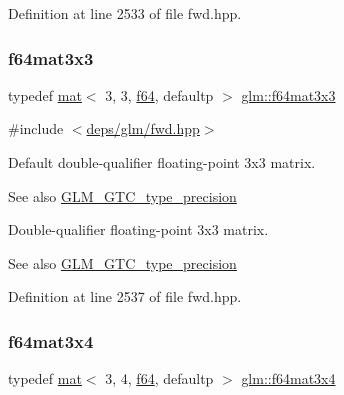 Definition at line 2533 of file fwd.\+hpp.

\mbox{\label{group__gtc__type__precision_ga3b494201796c4200886e59f9695ecff0}} 
\subsubsection{\texorpdfstring{f64mat3x3}{f64mat3x3}}
{\footnotesize\ttfamily typedef \hyperlink{structglm_1_1mat}{mat}$<$ 3, 3, \hyperlink{group__gtc__type__precision_ga2bba392e555124b36cde6abba349bab3}{f64}, defaultp $>$ \hyperlink{group__gtc__type__precision_ga3b494201796c4200886e59f9695ecff0}{glm\+::f64mat3x3}}



{\ttfamily \#include $<$\hyperlink{fwd_8hpp}{deps/glm/fwd.\+hpp}$>$}

Default double-\/qualifier floating-\/point 3x3 matrix. \begin{DoxySeeAlso}{See also}
\hyperlink{group__gtc__type__precision}{G\+L\+M\+\_\+\+G\+T\+C\+\_\+type\+\_\+precision}
\end{DoxySeeAlso}
Double-\/qualifier floating-\/point 3x3 matrix. \begin{DoxySeeAlso}{See also}
\hyperlink{group__gtc__type__precision}{G\+L\+M\+\_\+\+G\+T\+C\+\_\+type\+\_\+precision} 
\end{DoxySeeAlso}


Definition at line 2537 of file fwd.\+hpp.

\mbox{\label{group__gtc__type__precision_gaddb7f46e5a007c31348305de542e0d52}} 
\subsubsection{\texorpdfstring{f64mat3x4}{f64mat3x4}}
{\footnotesize\ttfamily typedef \hyperlink{structglm_1_1mat}{mat}$<$ 3, 4, \hyperlink{group__gtc__type__precision_ga2bba392e555124b36cde6abba349bab3}{f64}, defaultp $>$ \hyperlink{group__gtc__type__precision_gaddb7f46e5a007c31348305de542e0d52}{glm\+::f64mat3x4}}



